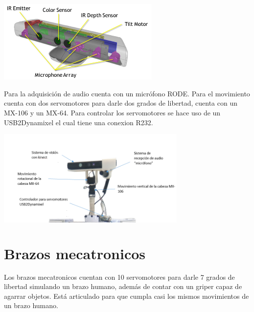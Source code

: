 \documentclass[user_manual.tex]{subfiles}
\begin{document}
\begin{center}
\includegraphics[width=0.6\textwidth]{Figures/Hardware/Partes/Kinect_sensors.png}
\label{fig:Hardware:Diagramas:Justina:Vision:Kinect}
\end{center}

Para la adquisición de audio cuenta con un micrófono RODE. Para el movimiento cuenta con dos servomotores
para darle dos grados de libertad, cuenta con un MX-106 y un MX-64. Para controlar los servomotores se hace uso de un
USB2Dynamixel el cual tiene una conexion R232.

\begin{center}
\includegraphics[width=0.7\textwidth]{Figures/Hardware/Diagramas/Cabeza.png}
\label{fig:Hardware:Diagramas:Justina:Completa}
\end{center}

\newpage
\section{Brazos mecatronicos}
Los brazos mecatronicos cuentan con 10 servomotores para darle 7 grados de libertad simulando un brazo humano, además de contar con un griper capaz de agarrar objetos. Está articulado para que cumpla casi los mismos movimientos de un brazo humano.
\end{document}
